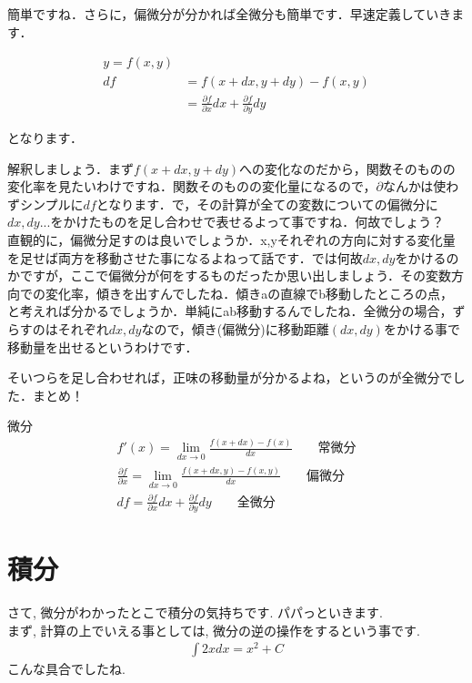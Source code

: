 \documentclass[11pt,a4paper,uplatex]{ujreport}
\begin{document}
簡単ですね．さらに，偏微分が分かれば全微分も簡単です．早速定義していきます．

\begin{align}
\label{eq:all-partial}
y = f(x,y) \nonumber \\
df &= f(x+dx, y+dy) - f(x,y)\\ 
&= \frac{\partial f}{\partial x}dx + \frac{\partial f}{\partial y}dy
\end{align}

となります．

解釈しましょう．まず$f(x+dx, y+dy)$への変化なのだから，関数そのものの変化率を見たいわけですね．関数そのものの変化量になるので，$\partial$なんかは使わずシンプルに$df$となります．で，その計算が全ての変数についての偏微分に$dx, dy...$をかけたものを足し合わせで表せるよって事ですね．何故でしょう？\\


直観的に，偏微分足すのは良いでしょうか．x,yそれぞれの方向に対する変化量を足せば両方を移動させた事になるよねって話です．では何故$dx, dy$をかけるのかですが，ここで偏微分が何をするものだったか思い出しましょう．その変数方向での変化率，傾きを出すんでしたね．傾きaの直線でb移動したところの点，と考えれば分かるでしょうか．単純にab移動するんでしたね．全微分の場合，ずらすのはそれぞれ$dx, dy$なので，傾き(偏微分)に移動距離$(dx,dy)$をかける事で移動量を出せるというわけです．

そいつらを足し合わせれば，正味の移動量が分かるよね，というのが全微分でした．まとめ！

\begin{screen}
微分
\begin{eqnarray}
f'(x) =\lim_{dx \rightarrow 0} \frac{f(x+dx) - f(x)}{dx} \qquad \text{常微分} \nonumber \\
\frac{\partial f}{\partial x} = \lim_{dx \rightarrow 0} \frac{f(x+dx, y) - f(x, y)}{dx} \qquad \text{偏微分}\nonumber \\
df = \frac{\partial f}{\partial x}dx + \frac{\partial f}{\partial y}dy \qquad \text{全微分} \nonumber
\end{eqnarray}
\end{screen}



\section{積分}
さて, 微分がわかったとこで積分の気持ちです. パパっといきます.\\
まず, 計算の上でいえる事としては, 微分の逆の操作をするという事です.
\begin{eqnarray}
\label{eq:int}
\int 2x dx= x^2 + C
\end{eqnarray}
こんな具合でしたね. \\
\end{document}
